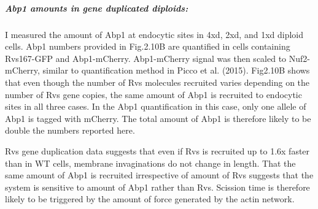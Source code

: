 		\subparagraph{Abp1 amounts in gene duplicated diploids:}
		
I measured the amount of Abp1 at endocytic sites in 4xd, 2xd, and 1xd diploid cells. Abp1 numbers provided in Fig.2.10B are quantified in cells containing Rvs167-GFP and Abp1-mCherry.  Abp1-mCherry signal was then scaled to Nuf2-mCherry, similar to quantification method in Picco et al. (2015). Fig2.10B shows that even though the number of Rvs molecules recruited varies depending on the number of Rvs gene copies, the same amount of Abp1 is recruited to endocytic sites in all three cases. In the Abp1 quantification in this case, only one allele of Abp1 is tagged with mCherry. The total amount of Abp1 is therefore likely to be double the numbers reported here. 

Rvs gene duplication data suggests that even if Rvs is recruited up to 1.6x faster than in WT cells, membrane invaginations do not change in length. That the same amount of Abp1 is recruited irrespective of amount of Rvs suggests that the system is sensitive to amount of Abp1 rather than Rvs. Scission time is therefore likely to be triggered by the amount of force generated by the actin network. 


